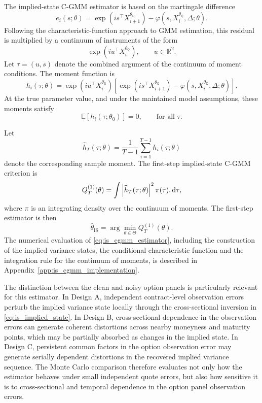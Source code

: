 \documentclass[11pt,a4paper,notitlepage]{article}
\numberwithin{equation}{section}
\begin{document}
The implied-state C-GMM estimator is based on the martingale difference
\[
e_i(s;\theta)
=
\exp\left(
is^\top X_{i+1}^{\theta_{\mathbb Q}}
\right)
-
\varphi\left(s,X_i^{\theta_{\mathbb Q}},\Delta;\theta\right).
\label{eq:is_cgmm_error}
\]
Following the characteristic-function approach to GMM estimation, this residual is multiplied by a continuum of instruments of the form
\[
\exp\left(
iu^\top X_i^{\theta_{\mathbb Q}}
\right),
\qquad u\in\mathbb R^2 .
\]
Let \(\tau=(u,s)\) denote the combined argument of the continuum of moment conditions. The moment function is
\[
h_i(\tau;\theta)
=
\exp\left(
iu^\top X_i^{\theta_{\mathbb Q}}
\right)
\left[
\exp\left(
is^\top X_{i+1}^{\theta_{\mathbb Q}}
\right)
-
\varphi\left(s,X_i^{\theta_{\mathbb Q}},\Delta;\theta\right)
\right].
\label{eq:is_cgmm_moment}
\]
At the true parameter value, and under the maintained model assumptions, these moments satisfy
\[
\mathbb E\left[
h_i(\tau;\theta_0)
\right]
=
0,
\qquad
\text{for all } \tau .
\]

Let
\[
\widehat h_T(\tau;\theta)
=
\frac{1}{T-1}
\sum_{i=1}^{T-1}
h_i(\tau;\theta)
\]
denote the corresponding sample moment. The first-step implied-state C-GMM criterion is
\[
Q_T^{(1)}(\theta)
=
\int
\left|
\widehat h_T(\tau;\theta)
\right|^2
\pi(\tau),\dif\tau ,
\label{eq:is_cgmm_first_step_criterion}
\]
where \(\pi\) is an integrating density over the continuum of moments. The first-step estimator is then
\begin{equation}
\widehat\theta_{\mathrm{IS}}
=
\arg\min_{\theta\in\Theta}
Q_T^{(1)}(\theta).
\label{eq:is_cgmm_estimator}
\end{equation}
The numerical evaluation of \eqref{eq:is_cgmm_estimator}, including the construction of the implied variance states, the conditional characteristic function and the integration rule for the continuum of moments, is described in Appendix~\ref{app:is_cgmm_implementation}.

The distinction between the clean and noisy option panels is particularly relevant for this estimator. In Design A, independent contract-level observation errors perturb the implied variance state locally through the cross-sectional inversion in \eqref{eq:is_implied_state}. In Design B, cross-sectional dependence in the observation errors can generate coherent distortions across nearby moneyness and maturity points, which may be partially absorbed as changes in the implied state. In Design C, persistent common factors in the option observation error may generate serially dependent distortions in the recovered implied variance sequence. The Monte Carlo comparison therefore evaluates not only how the estimator behaves under small independent quote errors, but also how sensitive it is to cross-sectional and temporal dependence in the option panel observation errors.
\end{document}
